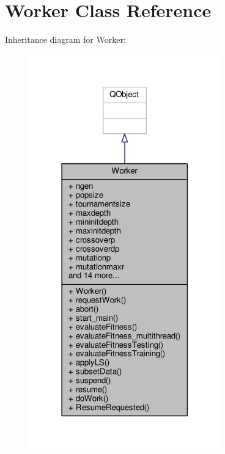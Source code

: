 \hypertarget{classWorker}{}\section{Worker Class Reference}
\label{classWorker}


Inheritance diagram for Worker\+:
\nopagebreak
\begin{figure}[H]
\begin{center}
\leavevmode
\includegraphics[width=234pt]{classWorker__inherit__graph}
\end{center}
\end{figure}


